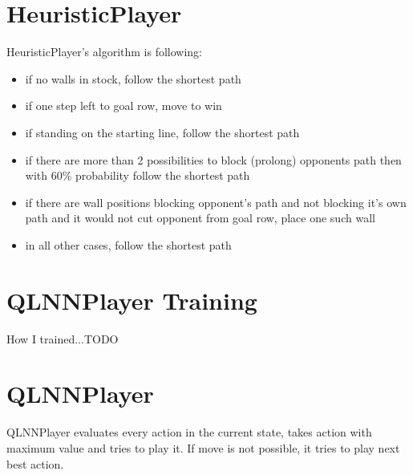 \section{HeuristicPlayer}
HeuristicPlayer's algorithm is following:
\begin{itemize}
  \vspace*{-0.25cm}
  \setlength\itemsep{-0.15cm}

  \item if no walls in stock, follow the shortest path
  \item if one step left to goal row, move to win
  \item if standing on the starting line, follow the shortest path
  \item if there are more than 2 possibilities to block (prolong) opponents
        path then with $60\%$ probability follow the shortest path
  \item if there are wall positions blocking opponent's path and not
        blocking it's own path and it would not cut opponent from goal row,
        place one such wall
  \item in all other cases, follow the shortest path

  \vspace*{-0.25cm}
\end{itemize}

\section{QLNNPlayer Training}
How I trained...TODO

\section{QLNNPlayer}
QLNNPlayer evaluates every action in the current state, takes action
with maximum value and tries to play it. If move is not possible, it tries to
play next best action.
